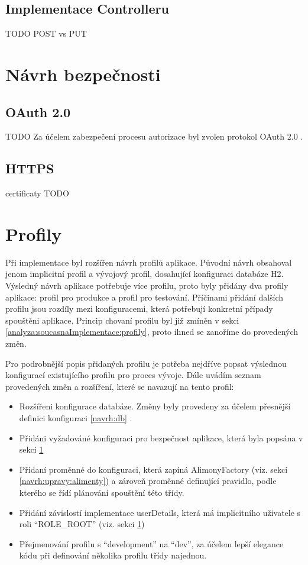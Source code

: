     \subsection{Implementace Controlleru}
        TODO POST vs PUT

\section{Návrh bezpečnosti}\label{navrh:bezpecnost}
    \subsection{OAuth 2.0}
        TODO Za účelem zabezpečení procesu autorizace byl zvolen protokol OAuth 2.0 . 
        
    \subsection{HTTPS}
        certificaty TODO
        
\section{Profily}\label{navrh:profily}
    Při implementace byl rozšířen návrh profilů aplikace. Původní návrh obsahoval jenom implicitní profil a vývojový profil, dosahující konfiguraci databáze H2. Výsledný návrh aplikace potřebuje více profilu, proto byly přidány dva profily aplikace: profil pro produkce a profil pro testování. Příčinami přidání dalších profilu jsou rozdíly mezi konfiguracemi, která potřebují konkretní případy spouštěni aplikace. Princip chovaní profilu byl již zmíněn v sekci \ref{analyza:soucasnaImplementace:profily}, proto ihned se zanoříme do provedených změn.
    
    Pro podrobnější popis přidaných profilu je potřeba nejdříve popsat výslednou konfigurací existujícího profilu pro proces vývoje. Dále uvádím seznam provedených změn a rozšíření, které se navazují na tento profil:
    \begin{itemize}
            \item Rozšířeni konfigurace databáze. Změny byly provedeny za účelem přesnější definici konfiguraci \ref{navrh:db} . 
            \item Přidáni vyžadováné konfiguraci pro bezpečnost aplikace, která byla popsána v sekci \ref{navrh:bezpecnost} 
            \item Přidaní proměnné do konfiguraci, která zapíná AlimonyFactory (viz. sekci \ref{navrh:upravy:alimenty}) a zároveň proměnné definující pravidlo, podle kterého se řídí plánováni spouštění této třídy.
            \item Přidání závislostí implementace userDetails, která má implicitního uživatele s roli \enquote{ROLE\_ROOT} (viz. sekci \ref{navrh:bezpecnost})
            \item Přejmenování profilu s \enquote{development} na \enquote{dev}, za účelem lepší elegance kódu při definování několika profilu třídy najednou.
    \end{itemize}
    
